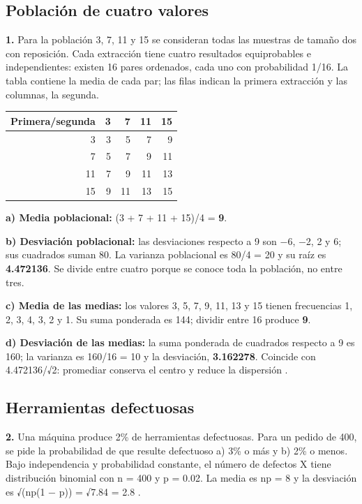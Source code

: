 {\clearpage
\subsection{Población de cuatro valores}
\textbf{1.} Para la población 3, 7, 11 y 15 se consideran todas las muestras de tamaño dos con reposición. Cada extracción tiene cuatro resultados equiprobables e independientes: existen 16 pares ordenados, cada uno con probabilidad 1/16. La tabla contiene la media de cada par; las filas indican la primera extracción y las columnas, la segunda.

\begin{center}
\begin{tabular}{r|rrrr}
\textbf{Primera/segunda} & \textbf{3} & \textbf{7} & \textbf{11} & \textbf{15}\\\hline
3 & 3 & 5 & 7 & 9\\
7 & 5 & 7 & 9 & 11\\
11 & 7 & 9 & 11 & 13\\
15 & 9 & 11 & 13 & 15\\
\end{tabular}
\end{center}

\textbf{a) Media poblacional:} (3 + 7 + 11 + 15)/4 = \textbf{9}.

\textbf{b) Desviación poblacional:} las desviaciones respecto a 9 son −6, −2, 2 y 6; sus cuadrados suman 80. La varianza poblacional es 80/4 = 20 y su raíz es \textbf{4.472136}. Se divide entre cuatro porque se conoce toda la población, no entre tres.

\textbf{c) Media de las medias:} los valores 3, 5, 7, 9, 11, 13 y 15 tienen frecuencias 1, 2, 3, 4, 3, 2 y 1. Su suma ponderada es 144; dividir entre 16 produce \textbf{9}.

\textbf{d) Desviación de las medias:} la suma ponderada de cuadrados respecto a 9 es 160; la varianza es 160/16 = 10 y la desviación, \textbf{3.162278}. Coincide con 4.472136/√2: promediar conserva el centro y reduce la dispersión \citep{holmesBusiness2023}.

\clearpage
\subsection{Herramientas defectuosas}
\textbf{2.} Una máquina produce 2\% de herramientas defectuosas. Para un pedido de 400, se pide la probabilidad de que resulte defectuoso a) 3\% o más y b) 2\% o menos. Bajo independencia y probabilidad constante, el número de defectos X tiene distribución binomial con n = 400 y p = 0.02. La media es np = 8 y la desviación es √(np(1 − p)) = √7.84 = 2.8 \citep{holmesBusiness2023}.

}
